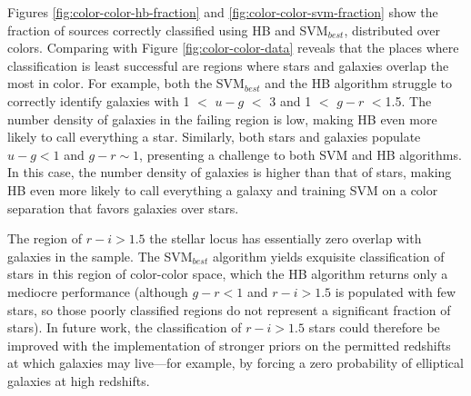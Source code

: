 \documentclass[12pt,preprint]{aastex}
\begin{document}
Figures
\ref{fig:color-color-hb-fraction} and \ref{fig:color-color-svm-fraction} show the fraction of sources
correctly classified using HB and SVM$_{best}$, distributed over
colors.  Comparing with Figure \ref{fig:color-color-data} reveals that the places where classification is least successful
are regions where stars and galaxies overlap the most in color.  For example, both the SVM$_{best}$ and the HB algorithm struggle to correctly identify galaxies with 1 $<$ $u-g$ $<$ 3 and 1 $<$ $g-r$ $<$1.5.  The number density of galaxies in the failing region is low, making HB even more likely to call everything a star.  Similarly, both stars and galaxies populate $u-g < 1$ and $g-r \sim 1$, presenting a challenge to both SVM and HB algorithms.  In this case, the number density of galaxies is higher than that of stars, making HB even more likely to call everything a galaxy and training SVM on a color separation that favors galaxies over stars.  

The region of $r-i>1.5$ the stellar locus has essentially zero overlap with galaxies in the sample.  The SVM$_{best}$ algorithm yields exquisite classification of stars in this region of color-color space, which the HB algorithm returns only a mediocre performance (although $g-r < 1$ and $r-i > 1.5$ is populated with few stars, so those poorly classified regions do not represent a significant fraction of stars).  In future work, the classification of $r-i > 1.5$ stars could therefore be improved with the implementation of stronger priors on the permitted redshifts at which galaxies may live---for example, by forcing a zero probability of elliptical galaxies at high redshifts.

\end{document}
